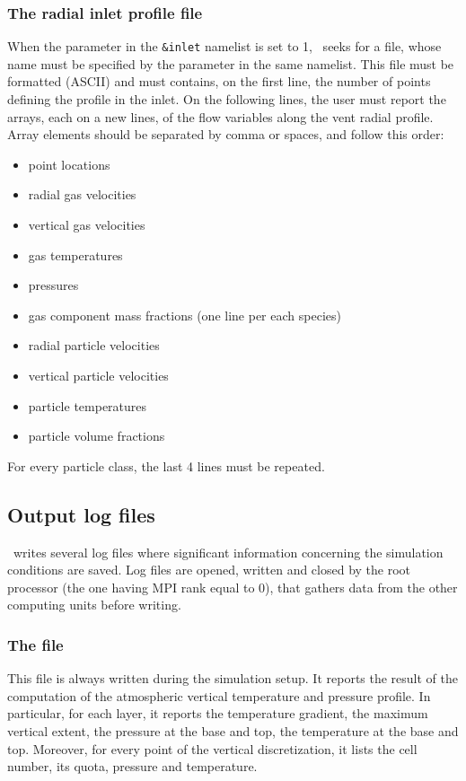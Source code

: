 \subsubsection{The radial inlet profile file}
When the  parameter in the 
{\tt \&inlet} namelist is set to 1, \PDAC\
seeks for a file, whose name must be specified by
the parameter  in the same namelist.
This file must be formatted (ASCII) and must contains,
on the first line, the number of points defining the profile in the inlet.
On the following lines, the user must report the arrays, each on a new
lines, of the flow variables along the vent radial profile.
Array elements should be separated by comma or spaces, and follow this order:
\begin{itemize}
\item point locations
\item radial gas velocities
\item vertical gas velocities
\item gas temperatures
\item pressures
\item gas component mass fractions (one line per each species)
\item radial particle velocities
\item vertical particle velocities
\item particle temperatures
\item particle volume fractions
\end{itemize}
For every particle class, the last 4 lines must be repeated.

\subsection{Output log files}

\PDAC\ writes several log files where significant information
concerning the simulation conditions are saved.
Log files are opened,
written and closed by the root processor (the one having MPI rank equal to 0), 
that gathers data from the other computing units before writing.

\subsubsection{The  file}
This file is always written during the simulation setup.
It reports the result of the computation of the atmospheric
vertical temperature and pressure profile. In particular, 
for each layer, it reports the temperature gradient, the maximum vertical
extent, the pressure at the base and top, the temperature at the base and top.
Moreover, for every point of the vertical discretization, it lists the 
cell number, its quota, pressure and temperature.

